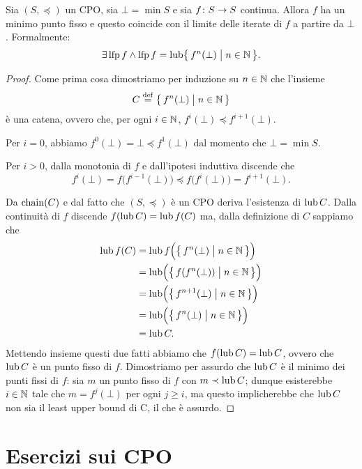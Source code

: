 \begin{teorema} 
Sia $(S, \preceq)$ un CPO, sia $\bot = \min S$ e sia
$\mathord{f}\colon S\to S$ continua.
Allora $f$ ha un minimo punto fisso e questo coincide con il limite
delle iterate di $f$ a partire da $\bot$.
Formalmente:
\[
  \exists \mathop{\mathrm{lfp}}\nolimits f
    \land
      \mathop{\mathrm{lfp}}\nolimits f = \mathop{\mathrm{lub}}\nolimits \bigl\{\, f^n(\bot) \bigm| n \in \mathbb{N} \,\bigr\}.
\]
\begin{proof}
Come prima cosa dimostriamo per induzione su $n \in \mathbb{N}$
che l'insieme
\[
  C \defeq \bigl\{\, f^n(\bot) \bigm| n \in \Nset \,\bigr\}
\]
è una catena, ovvero che, per ogni $i \in \mathbb{N}$,
$f^i(\bot) \preceq f^{i+1}(\bot)$.

Per $i = 0$, abbiamo $f^0(\bot) = \bot \preceq f^1(\bot)$
dal momento che $\bot = \min S$.

Per $i > 0$, dalla monotonia di $f$ e dall'ipotesi induttiva discende che
\[
  f^i(\bot) = f\bigl(f^{i-1}(\bot)\bigr)
            \preceq f\bigl(f^i(\bot)\bigr)
            = f^{i+1}(\bot).
\]

Da $\mathop{\mathrm{chain}}\nolimits(C)$ e dal fatto che $(S, \preceq)$ è un CPO deriva l'esistenza
di $\mathop{\mathrm{lub}}\nolimits C$.
Dalla continuità di $f$ discende $f(\mathop{\mathrm{lub}}\nolimits C) = \mathop{\mathrm{lub}}\nolimits f(C)$ ma,
dalla definizione di $C$ sappiamo che
\begin{align*}
  \mathop{\mathrm{lub}}\nolimits f(C)
    &= \mathop{\mathrm{lub}}\nolimits f\Bigl(\bigl\{\, f^n(\bot) \bigm| n \in \mathbb{N} \,\bigr\}\Bigr) \\
    &= \mathop{\mathrm{lub}}\nolimits \Bigl(\bigl\{\, f(f^n(\bot)) \bigm| n \in \mathbb{N} \,\bigr\}\Bigr) \\
    &= \mathop{\mathrm{lub}}\nolimits \Bigl(\bigl\{\, f^{n+1}(\bot) \bigm| n \in \mathbb{N} \,\bigr\}\Bigr) \\
    &= \mathop{\mathrm{lub}}\nolimits \Bigl(\bigl\{\, f^n(\bot) \bigm| n \in \mathbb{N} \,\bigr\}\Bigr) \\
    &= \mathop{\mathrm{lub}}\nolimits C.
\end{align*}
Mettendo insieme questi due fatti abbiamo che $f(\mathop{\mathrm{lub}}\nolimits C) = \mathop{\mathrm{lub}}\nolimits C$,
ovvero che $\mathop{\mathrm{lub}}\nolimits C$ è un punto fisso di $f$.
Dimostriamo per assurdo che $\mathop{\mathrm{lub}}\nolimits C$ è il minimo dei punti fissi di $f$:
sia $m$ un punto fisso di $f$ con $m \prec \mathop{\mathrm{lub}}\nolimits C$;
dunque esisterebbe $i \in \mathbb{N}$ tale che $m = f^j(\bot)$ per ogni $j \geq i$,
ma questo implicherebbe che $\mathop{\mathrm{lub}}\nolimits C$ non sia il least upper bound di C,
il che è assurdo.
  \end{proof}
\end{teorema}

\section{Esercizi sui CPO}

